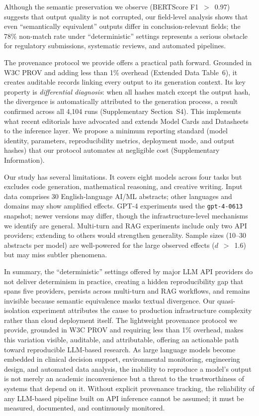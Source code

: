 \documentclass[sn-nature]{sn-jnl}
\begin{document}
Although the semantic preservation we observe (BERTScore F1~$>$~0.97) suggests that output quality is not corrupted, our field-level analysis shows that even ``semantically equivalent'' outputs differ in conclusion-relevant fields; the 78\% non-match rate under ``deterministic'' settings represents a serious obstacle for regulatory submissions, systematic reviews, and automated pipelines.

The provenance protocol we provide offers a practical path forward.
Grounded in W3C PROV\cite{w3cprov2013} and adding less than 1\% overhead (Extended Data Table~6), it creates auditable records linking every output to its generation context.
Its key property is \emph{differential diagnosis}: when all hashes match except the output hash, the divergence is automatically attributed to the generation process, a result confirmed across all 4,104 runs (Supplementary Section~S4).
This implements what recent editorials have advocated\cite{editorial2024framework} and extends Model Cards\cite{mitchell2019model} and Datasheets\cite{gebru2021datasheets} to the inference layer.
We propose a minimum reporting standard (model identity, parameters, reproducibility metrics, deployment mode, and output hashes) that our protocol automates at negligible cost (Supplementary Information).

Our study has several limitations.
It covers eight models across four tasks but excludes code generation, mathematical reasoning, and creative writing.
Input data comprises 30 English-language AI/ML abstracts; other languages and domains may show amplified effects.
GPT-4 experiments used the \texttt{gpt-4-0613} snapshot; newer versions may differ, though the infrastructure-level mechanisms we identify are general.
Multi-turn and RAG experiments include only two API providers; extending to others would strengthen generality.
Sample sizes (10--30 abstracts per model) are well-powered for the large observed effects ($d$~$>$~1.6) but may miss subtler phenomena.

In summary, the ``deterministic'' settings offered by major LLM API providers do not deliver determinism in practice, creating a hidden reproducibility gap that spans five providers, persists across multi-turn and RAG workflows, and remains invisible because semantic equivalence masks textual divergence.
Our quasi-isolation experiment attributes the cause to production infrastructure complexity rather than cloud deployment itself.
The lightweight provenance protocol we provide, grounded in W3C PROV and requiring less than 1\% overhead, makes this variation visible, auditable, and attributable, offering an actionable path toward reproducible LLM-based research.
As large language models become embedded in clinical decision support, environmental monitoring, engineering design, and automated data analysis, the inability to reproduce a model's output is not merely an academic inconvenience but a threat to the trustworthiness of systems that depend on it.
Without explicit provenance tracking, the reliability of any LLM-based pipeline built on API inference cannot be assumed; it must be measured, documented, and continuously monitored.
\end{document}
